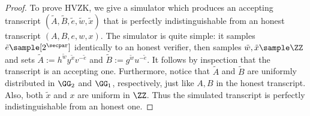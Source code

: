 \begin{proof}
    To prove HVZK, we give a simulator which produces an accepting transcript $(\tilde{A}, \tilde{B}, \tilde{e}, \tilde{w}, \tilde{x})$ that is perfectly indistinguishable from an honest transcript $(A, B, e, w, x)$. The simulator is quite simple: it samples $\tilde{e} \sample [2^\secpar]$ identically to an honest verifier, then samples $\tilde{w}, \tilde{x} \sample \ZZ$ and sets $\tilde{A} := h^{\tilde{w}} y^{\tilde{x}} v^{-\tilde{e}}$ and $\tilde{B} := g^{\tilde{w}} u^{-\tilde{e}}$. It follows by inspection that the transcript is an accepting one. Furthermore, notice that $\tilde{A}$ and $\tilde{B}$ are uniformly distributed in $\GG_2$ and $\GG_1$, respectively, just like $A, B$ in the honest transcript. Also, both $\tilde{x}$ and $x$ are uniform in $\ZZ$. Thus the simulated transcript is perfectly indistinguishable from an honest one.
\end{proof}


    

